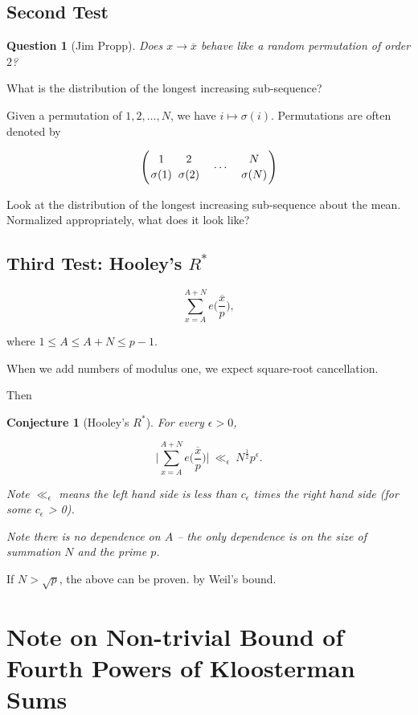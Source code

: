\documentclass[12pt,letterpaper]{report}
\newcommand\be{\begin{equation}}
\newcommand\ee{\end{equation}}
\newcommand{\foh}{\frac{1}{2}}  %
\newtheorem{conj}[thm]{Conjecture}
\newtheorem{que}[thm]{Question}
\begin{document}
\subsection{Second Test}

\begin{que}[Jim Propp] Does $x \to \overline{x}$ behave like a
random permutation of order $2$? \end{que}

What is the distribution of the longest increasing sub-sequence?

Given a permutation of $1,2, \dots, N$, we have $i \mapsto
\sigma(i)$. Permutations are often denoted by

\be \Bigg( {1 \atop \sigma(1)}\ {2 \atop \sigma(2)} \ \ \ \cdots \
\ \ {N \atop \sigma(N)} \Bigg) \ee

Look at the distribution of the longest increasing sub-sequence
about the mean. Normalized appropriately, what does it look like?


\subsection{Third Test: Hooley's $R^*$}

\be \sum_{x = A}^{A+N} e\Big( \frac{\overline{x}}{p}\Big), \ee

where $1 \le A \le A+N \le p-1$.

When we add numbers of modulus one, we expect square-root
cancellation.

Then

\begin{conj}[Hooley's $R^*$]
For every $\epsilon > 0$,

\be \Bigg| \sum_{x = A}^{A+N} e\Big( \frac{\overline{x}}{p}\Big)
\Bigg| \ \ll_\epsilon \ N^\foh p^\epsilon. \ee

Note $\ll_\epsilon$ means the left hand side is less than
$c_\epsilon$ times the right hand side (for some $c_\epsilon$ >
0).

Note there is no dependence on $A$ -- the only dependence is on
the size of summation $N$ and the prime $p$.

\end{conj}

If $N > \sqrt{p}$, the above can be proven. by Weil's bound.



\section{Note on Non-trivial Bound of Fourth Powers of Kloosterman
Sums}
\end{document}
